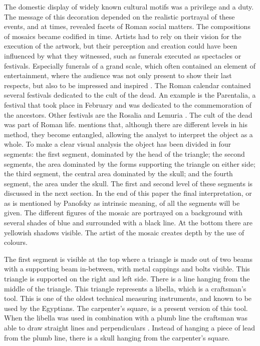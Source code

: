 	The domestic display of widely known cultural motifs was a privilege and a duty. 
The message of this decoration depended on the realistic portrayal of these events, and at times, revealed facets of Roman social matters. 
The compositions of mosaics became codified in time. Artists had to rely on their vision for the execution of the artwork, 
but their perception and creation could have been influenced by what they witnessed, such as funerals executed as spectacles or festivals. Especially funerals of a grand scale, which often contained an element of entertainment, where the audience was not only present to show their last respects, but also to be impressed and inspired  \parencites[112]{Kondoleon_1991}[89]{Hope_2009}. 
The Roman calendar contained several festivals dedicated to the cult of the dead. 
An example is the Parentalia, a festival that took place in February and was dedicated to the commemoration of the ancestors. Other festivals are the Rosalia and Lemuria \parencite[123--124]{Erasmo_2012}. 
The cult of the dead was part of Roman life.	\textcite {Panofsky_1939} mentions that, although there are different levels in his method, they become entangled, allowing the analyst to interpret the object as a whole. To make a clear visual analysis the object has been divided in four segments: the first segment, dominated by the  head of the triangle; the second segments, the area dominated by the forms supporting the triangle on either side; the third segment, the central area dominated by the skull; and the fourth segment, the area under the skull. 
The first and second level of these segments is discussed in the next section. 
In the end of this paper the final interpretation, or as is mentioned by Panofsky as intrinsic meaning, of all the segments will be given. The different figures of the mosaic are portrayed on a background with several shades of blue and surrounded with a black line. 
At the bottom there are yellowish shadows visible. The artist of the mosaic creates depth by the use of colours. 
	
	The first segment is visible at the top where a triangle is made out of two beams with a supporting beam in-between, with metal cappings and bolts visible. This triangle is supported on the right and left side. There is a line hanging from the middle of the triangle. 
This triangle represents a libella, which is a craftsman’s tool. This is one of the oldest technical measuring instruments, and known to be used by the Egyptians. 
The carpenter’s square, is a present version of this tool. 
When the libella was used in combination with a plumb line the craftsman was able to draw straight lines and perpendiculars \parencite[84]{Cuomo_2007}. 
Instead of hanging a piece of lead from the plumb line, there is a skull hanging from the carpenter’s square. 

